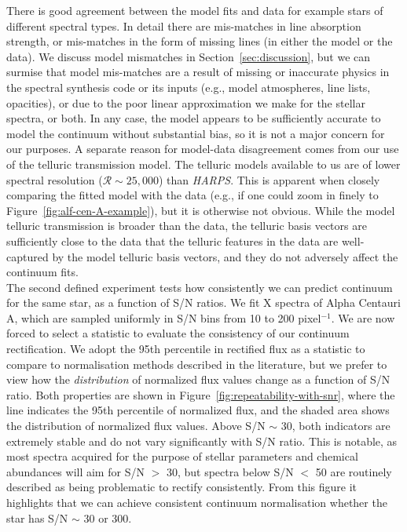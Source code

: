 \documentclass[modern]{aastex631}
\newcommand{\project}[1]{\textit{#1}}
\newcommand{\harps}{\project{HARPS}}
\newcommand{\todo}[1]{\textcolor{tab:red}{#1}}
\begin{document}
There is good agreement between the model fits and data for example stars of different spectral types. In detail there are mis-matches in line absorption strength, or mis-matches in the form of missing lines (in either the model or the data). We discuss model mismatches in Section~\ref{sec:discussion}, but we can surmise that model mis-matches are a result of missing or inaccurate physics in the spectral synthesis code or its inputs (e.g., model atmospheres, line lists, opacities), or due to the poor linear approximation we make for the stellar spectra, or both. In any case, the model appears to be sufficiently accurate to model the continuum without substantial bias, so it is not a major concern for our purposes. A separate reason for model-data disagreement comes from our use of the telluric transmission model. The telluric models available to us are of lower spectral resolution ($\mathcal{R} \sim 25{,}000$) than \harps. This is apparent when closely comparing the fitted model with the data (e.g., if one could zoom in finely to Figure~\ref{fig:alf-cen-A-example}), but it is otherwise not obvious. While the model telluric transmission is broader than the data, the telluric basis vectors are sufficiently close to the data that the telluric features in the data are well-captured by the model telluric basis vectors, and they do not adversely affect the continuum fits.\\



The second defined experiment tests how consistently we can predict continuum for the same star, as a function of S/N ratios. We fit \todo{X} spectra of Alpha Centauri A, which are sampled uniformly in S/N bins from 10 to 200 pixel$^{-1}$. We are now forced to select a statistic to evaluate the consistency of our continuum rectification. We adopt the 95th percentile in rectified flux as a statistic to compare to normalisation methods described in the literature, but we prefer to view how the \emph{distribution} of normalized flux values change as a function of S/N ratio. Both properties are shown in Figure~\ref{fig:repeatability-with-snr}, where the line indicates the 95th percentile of normalized flux, and the shaded area shows the distribution of normalized flux values. Above S/N $\sim$ 30, both indicators are extremely stable and do not vary significantly with S/N ratio. This is notable, as most spectra acquired for the purpose of stellar parameters and chemical abundances will aim for S/N $>$ 30, but spectra below S/N $<$ 50 are routinely described as being problematic to rectify consistently. From this figure it highlights that we can achieve consistent continuum normalisation whether the star has S/N $\sim$ 30 or 300.\\
\end{document}

